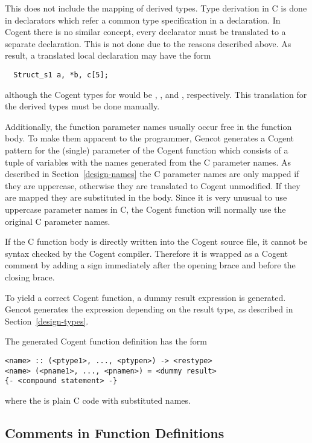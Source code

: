 This does not include the mapping of derived types. Type derivation in C is done in declarators which refer
a common type specification in a declaration. In Cogent there is no similar concept, every declarator must be 
translated to a separate declaration. This is not done due to the reasons described above. As result, a translated
local declaration may have the form
\begin{verbatim}
  Struct_s1 a, *b, c[5];
\end{verbatim}
although the Cogent types for  would be , , and 
, respectively. This translation for the derived types must be done manually.

Additionally, the function parameter names usually occur free in the function body. To make them apparent to
the programmer, Gencot generates a Cogent pattern for the (single) parameter of the Cogent function which 
consists of a tuple of variables with the names generated from the C parameter names. As described in 
Section~\ref{design-names} the C parameter names are only mapped if they are uppercase, otherwise they are
translated to Cogent unmodified. If they are mapped they are substituted in the body. Since it is very unusual
to use uppercase parameter names in C, the Cogent function will normally use the original C parameter names.

If the C function body is directly written into the Cogent source file, it cannot be syntax checked by the 
Cogent compiler. Therefore it is wrapped as a Cogent comment by adding a \code{-} sign immediately after the
opening brace and before the closing brace.

To yield a correct Cogent function, a dummy result expression is generated. Gencot generates the expression
depending on the result type, as described in Section~\ref{design-types}. 

The generated Cogent function definition has the form
\begin{verbatim}
<name> :: (<ptype1>, ..., <ptypen>) -> <restype>
<name> (<pname1>, ..., <pnamen>) = <dummy result>
{- <compound statement> -}
\end{verbatim}
where the  is plain C code with substituted names.

\subsection{Comments in Function Definitions}

